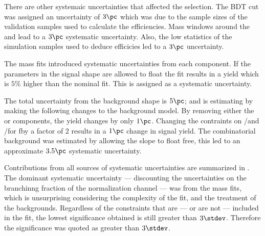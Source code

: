 There are other systemaic uncertainties that affected the selection.
The BDT cut was assigned an uncertainty of $3\pc$ which was due to the sample sizes of the
validation samples used to calculate the efficiencies.
Mass windows around the \Ds and \phii lead to a $3\pc$ systematic uncertainty.
Also, the low statistics of the simulation samples used to deduce efficicies led to a $3\pc$
uncertainty.

The mass fits introduced systematic uncertainties from each component.
If the parameters in the signal shape are allowed to float the fit results in a yield which is
$5\%$ higher than the nominal fit.
This is assigned as a systematic uncertainty.


The total uncertainty from the background shape is $5\pc$; and is estimating by making the
following changes to the background model.
By removing either the \btodsstrphi or \bstodsstrkstrk components, the yield changes by only $1\pc$.
Changing the contraints on \rA/\rB and \rC/\rD for \bstodskstrk fby a factor of 2 results in a
$1\pc$ change in signal yield.
The combinatorial background was estimated by allowing the slope to float free, this led to an
approximate $3.5\pc$ systematic uncertainty.


Contributions from all sources of systematic uncertainties are summarized in .
The dominant systematic uncertainty --- discounting the uncertainties on the branchinng fraction of
the normalization channel --- was from the mass fits, which is unsurprising considering the
complexity of the fit, and the treatment of the backgrounds.
Regardless of the constraints that are --- or are not --- included in the fit, the lowest
significance obtained is still greater than $3\stdev$.
Therefore the significance was quoted as greater than $3\stdev$.

